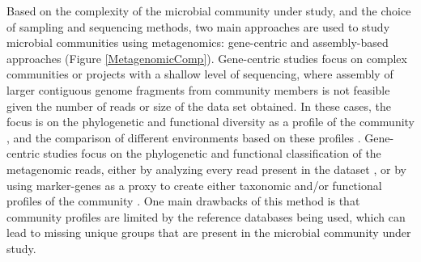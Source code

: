 Based on the complexity of the microbial community under study, and the choice of sampling and sequencing methods, two main approaches are used to study microbial communities using metagenomics: gene-centric and assembly-based approaches  (Figure \ref{MetagenomicComp}). 
Gene-centric studies focus on complex communities or projects with a shallow level of sequencing, where assembly of larger contiguous genome fragments from community members is not feasible given the number of reads or size of the data set obtained. In these cases, the focus is on the phylogenetic and functional diversity as a profile of the community \cite{Ugalde:2013he,Brulc:2009fi}, and the comparison of different environments based on these profiles \cite{Dinsdale:2008cd,Willner:2009iv,Reed:2014jj}. Gene-centric studies focus on the phylogenetic and functional classification of the metagenomic reads, either by analyzing every read present in the dataset \cite{Brady:2011hi,Parks:2011bh,AmritaPati:2011ba}, or by using marker-genes as a proxy to create either taxonomic and/or functional profiles of the community \cite{Darling:2014ej,Segata:2012ba}.  One main drawbacks of this method is that community profiles are limited by the reference databases being used, which can lead to missing unique groups that are present in the microbial community under study. 



